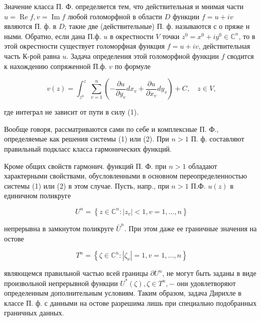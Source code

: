 \documentclass[10pt]{article}
\begin{document}
Значение класса П. Ф. определяется тем, что действительная и мнимая части $u=\operatorname{Re} f, v=\operatorname{Im} f$ любой голоморфной в области $D$ функции $f=u+i v$ являются П. ф. в $D$; такие две (действительные) П. ф. называются с о пряже н ными. Обратно, если дана П.ф. $u$ в окрестности $V$ точки $z^{0}=x^{0}+i y^{0} \in \mathbb{C}^{n}$, то в этой окрестности существует голоморфная функция $f=u+i v$, действительная часть К-рой равна $u$. Задача определения этой голоморфной функции $f$ сводится к нахождению сопряженной П.ф. $v$ по формуле



\[

v(z)=\int_{z^{0}}^{z} \sum_{v=1}^{n}\left(-\frac{\partial u}{\partial y_{v}} d x_{v}+\frac{\partial u}{\partial x_{v}} d y_{v}\right)+C, \quad z \in V,

\]



где интеграл не зависит от пути в силу (1).



Вообще говоря, рассматриваются сами по себе и комплексные П. Ф., определяемые как решения системы (1) или (2). При $n>1$ П. ф. составляют правильный подкласс класса гармонических функций.



Кроме общих свойств гармонич. функций П. Ф. при $n>1$ обладают характерными свойствами, обусловленными в основном переопределенностью системы (1) или (2) в этом случае. Пусть, напр., при $n>1$ П.Ф. $u(z)$ в единичном поликруге



\[

U^{n}=\left\{z \in \mathbb{C}^{n}:\left|z_{v}\right|<1, v=1, \ldots, n\right\}

\]



непрерывна в замкнутом поликруге $\bar{U}^{n}$. При этом даже ее граничные значения на остове



\[

T^{n}=\left\{\zeta \in \mathbb{C}^{n}:\left|\zeta_{\nu}\right|=1, v=1, \ldots, n\right\}

\]



являющемся правильной частью всей границы $\partial U^{n}$, не могут быть заданы в виде произвольной непрерывной функции $U^{*}(\zeta), \zeta \in T^{n},-$ они удовлетворяют определенным дополнительным условиям. Таким образом, задача Дирихле в классе П. ф. с данными на остове разрешима лишь при специально подобранных граничных данных.
\end{document}
